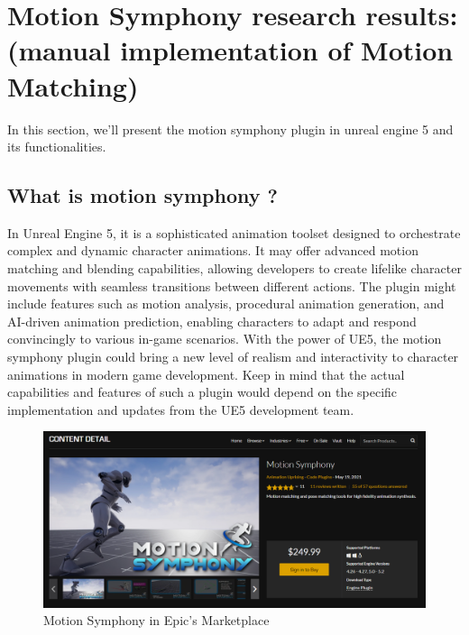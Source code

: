 \documentclass[12pt]{book}
\begin{document}
\section{Motion Symphony research results: \\(manual implementation of Motion Matching)}
In this section, we'll present the motion symphony plugin in unreal engine 5 and its functionalities.\label{appendix:MS} 
\subsection{What is motion symphony ?}
In Unreal Engine 5, it is a sophisticated animation toolset designed to orchestrate complex and dynamic character animations. It may offer advanced motion matching and blending capabilities, allowing developers to create lifelike character movements with seamless transitions between different actions. The plugin might include features such as motion analysis, procedural animation generation, and AI-driven animation prediction, enabling characters to adapt and respond convincingly to various in-game scenarios. With the power of UE5, the motion symphony plugin could bring a new level of realism and interactivity to character animations in modern game development. Keep in mind that the actual capabilities and features of such a plugin would depend on the specific implementation and updates from the UE5 development team.
\begin{figure}[!h]
    \centering
    \includegraphics[scale=0.3]{./Figures/Images/Motion Symphony/MotionSymphony.jpg}
    \caption{Motion Symphony in Epic’s Marketplace}
    \label{Motion Symphony in Epic’s Marketplace}
\end{figure}
\end{document}
